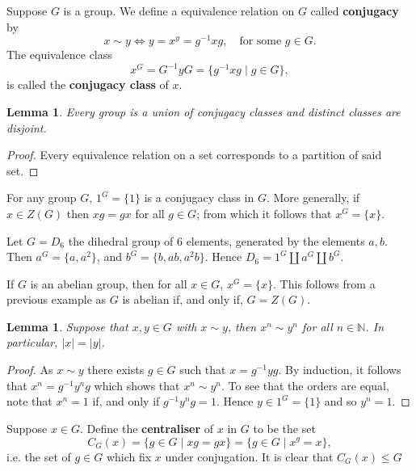 \documentclass[11pt, notitlepage]{article}
\numberwithin{equation}{section}
\theoremstyle{plain}
\newtheorem{lemma}[theorem]{Lemma}
\theoremstyle{definition}
\newenvironment{example}
	{\pushQED{\qed}\renewcommand{\qedsymbol}{$\blacktriangleleft$}\examplex}
	{\popQED\endexamplex}
\newcommand{\N}{\mathbb{N}}
\begin{document}
Suppose $G$ is a group. We define a equivalence relation on $G$ called \textbf{conjugacy} by
\[
    x \sim y \iff y = x^y = g^{-1}xg, \quad \text{for some }g \in G.
\]
The equivalence class
\[
    x^G = G^{-1}yG = \{g^{-1}xg \mid g \in G\},
\]
is called the \textbf{conjugacy class} of $x$.

\begin{lemma}
Every group is a union of conjugacy classes and distinct classes are disjoint.
\end{lemma}

\begin{proof}
Every equivalence relation on a set corresponds to a partition of said set.
\end{proof}

\begin{example}
For any group $G$, $1^G = \{1\}$ is a conjugacy class in $G$. More generally, if $x \in Z(G)$ then $xg = gx$ for all $g \in G$; from which it follows that $x^G = \{x\}$.
\end{example}

\begin{example}
Let $G = D_6$ the dihedral group of 6 elements, generated by the elements $a,b$. Then $a^G = \{a,a^2\}$, and $b^G = \{b,ab,a^2b\}$. Hence $D_6 = 1^G \amalg a^G \amalg b^G$.
\end{example}

\begin{example}
If $G$ is an abelian group, then for all $x \in G$, $x^G = \{x\}$. This follows from a previous example as $G$ is abelian if, and only if, $G = Z(G)$.
\end{example}

\begin{lemma}
Suppose that $x,y \in G$ with $x \sim y$, then $x^n \sim y^n$ for all $n \in \N$. In particular, $|x| = |y|$.
\end{lemma}

\begin{proof}
As $x \sim y$ there exists $g \in G$ such that $x = g^{-1}yg$. By induction, it follows that $x^n = g^{-1}y^ng$ which shows that $x^n \sim y^n$. To see that the orders are equal, note that $x^n = 1$ if, and only if $g^{-1}y^n g = 1$. Hence $y \in 1^G = \{1\}$ and so $y^n = 1$.
\end{proof}

Suppose $x \in G$. Define the \textbf{centraliser} of $x$ in $G$ to be the set
\[
    C_G(x) = \{g \in G \mid xg = gx\} = \{g \in G \mid x^g = x\},
\]
i.e. the set of $g \in G$ which fix $x$ under conjugation. It is clear that $C_G(x) \le G$
\end{document}
